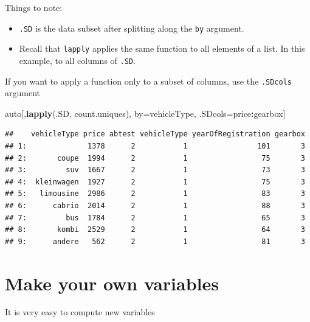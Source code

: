 \documentclass[]{book}
\newenvironment{Shaded}{\begin{snugshade}}{\end{snugshade}}
\newcommand{\KeywordTok}[1]{\textcolor[rgb]{0.13,0.29,0.53}{\textbf{#1}}}
\newcommand{\StringTok}[1]{\textcolor[rgb]{0.31,0.60,0.02}{#1}}
\newcommand{\CommentTok}[1]{\textcolor[rgb]{0.56,0.35,0.01}{\textit{#1}}}
\newcommand{\OperatorTok}[1]{\textcolor[rgb]{0.81,0.36,0.00}{\textbf{#1}}}
\newcommand{\NormalTok}[1]{#1}
\providecommand{\tightlist}{%
  \setlength{\itemsep}{0pt}\setlength{\parskip}{0pt}}
\theoremstyle{definition}
\theoremstyle{definition}
\theoremstyle{definition}
\theoremstyle{remark}
\begin{document}
Things to note:

\begin{itemize}
\tightlist
\item
  \texttt{.SD} is the data subset after splitting along the \texttt{by}
  argument.
\item
  Recall that \texttt{lapply} applies the same function to all elements
  of a list. In this example, to all columns of \texttt{.SD}.
\end{itemize}

If you want to apply a function only to a subset of columns, use the
\texttt{.SDcols} argument

\begin{Shaded}
\begin{Highlighting}[]
\NormalTok{auto[,}\KeywordTok{lapply}\NormalTok{(.SD, count.uniques), by=vehicleType, .SDcols=price}\OperatorTok{:}\NormalTok{gearbox]}
\end{Highlighting}
\end{Shaded}

\begin{verbatim}
##    vehicleType price abtest vehicleType yearOfRegistration gearbox
## 1:              1378      2           1                101       3
## 2:       coupe  1994      2           1                 75       3
## 3:         suv  1667      2           1                 73       3
## 4:  kleinwagen  1927      2           1                 75       3
## 5:   limousine  2986      2           1                 83       3
## 6:      cabrio  2014      2           1                 88       3
## 7:         bus  1784      2           1                 65       3
## 8:       kombi  2529      2           1                 64       3
## 9:      andere   562      2           1                 81       3
\end{verbatim}

\section{Make your own variables}\label{make-your-own-variables}

It is very easy to compute new variables

\begin{Shaded}
\end{Shaded}
\end{document}
